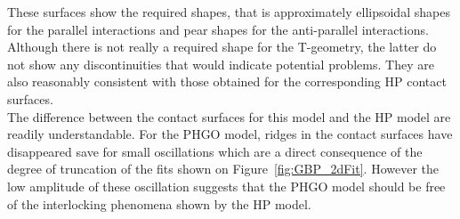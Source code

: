 These surfaces show the required shapes, that is approximately ellipsoidal shapes
for the parallel interactions and pear shapes for the anti-parallel
interactions. Although there is not really a required shape for the T-geometry, the latter do
not show any discontinuities that would indicate potential problems.
They are also reasonably consistent with those obtained for the corresponding HP contact surfaces.\\

The difference between the contact surfaces for this model and the HP model are readily
understandable. For the PHGO model, ridges in the contact surfaces have disappeared save for small
oscillations which are a direct consequence of the degree of truncation of the fits shown on
Figure~\ref{fig:GBP_2dFit}. However the low amplitude of these oscillation suggests that the PHGO
model should be free of the interlocking phenomena shown by the HP model.




